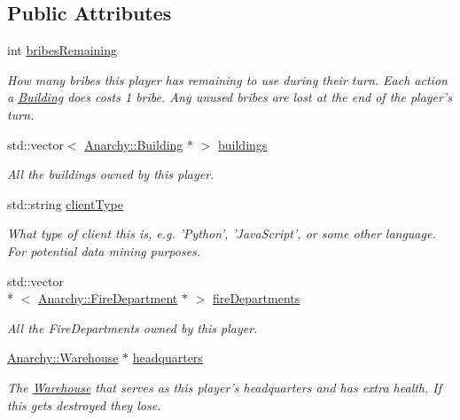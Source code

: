 \subsection*{Public Attributes}
\begin{DoxyCompactItemize}
\item 
int \hyperlink{classAnarchy_1_1Player_a439ac9bc65f337358c0169f6352a3336}{bribes\-Remaining}
\begin{DoxyCompactList}\small\item\em How many bribes this player has remaining to use during their turn. Each action a \hyperlink{classAnarchy_1_1Building}{Building} does costs 1 bribe. Any unused bribes are lost at the end of the player's turn. \end{DoxyCompactList}\item 
std\-::vector$<$ \hyperlink{classAnarchy_1_1Building}{Anarchy\-::\-Building} $\ast$ $>$ \hyperlink{classAnarchy_1_1Player_a2b80bb75995c73f78df64ca6241cbc7b}{buildings}
\begin{DoxyCompactList}\small\item\em All the buildings owned by this player. \end{DoxyCompactList}\item 
std\-::string \hyperlink{classAnarchy_1_1Player_af5b7bce5d4d05b69d8b83d095f3ab39e}{client\-Type}
\begin{DoxyCompactList}\small\item\em What type of client this is, e.\-g. 'Python', 'Java\-Script', or some other language. For potential data mining purposes. \end{DoxyCompactList}\item 
std\-::vector\\*
$<$ \hyperlink{classAnarchy_1_1FireDepartment}{Anarchy\-::\-Fire\-Department} $\ast$ $>$ \hyperlink{classAnarchy_1_1Player_a9ef8ddd89632fa942b09c5d5f47d432c}{fire\-Departments}
\begin{DoxyCompactList}\small\item\em All the Fire\-Departments owned by this player. \end{DoxyCompactList}\item 
\hyperlink{classAnarchy_1_1Warehouse}{Anarchy\-::\-Warehouse} $\ast$ \hyperlink{classAnarchy_1_1Player_a175881daf024ff4b2ed8b7b7d0a8ab6b}{headquarters}
\begin{DoxyCompactList}\small\item\em The \hyperlink{classAnarchy_1_1Warehouse}{Warehouse} that serves as this player's headquarters and has extra health. If this gets destroyed they lose. \end{DoxyCompactList}\item 

\end{DoxyCompactItemize}
